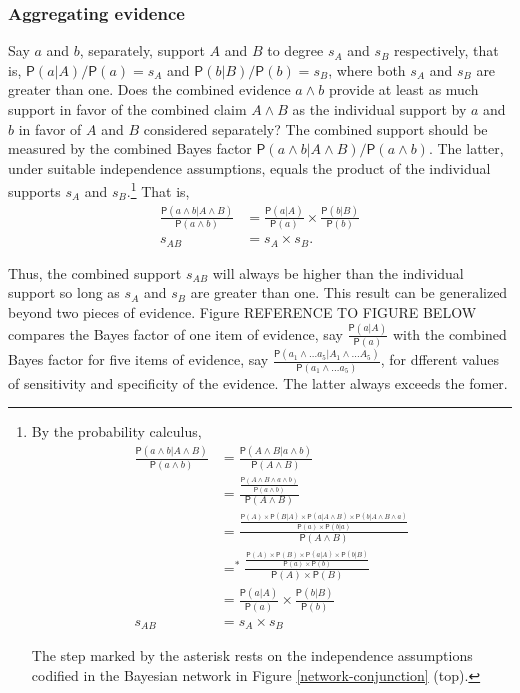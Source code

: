 \documentclass[10pt,dvipsnames,enabledeprecatedfontcommands]{scrartcl}
\newcommand{\et}{\wedge}
\newcommand{\pr}[1]{\mathsf{P}(#1)}
\begin{document}
\hypertarget{aggregating-evidence}{%
\subsubsection{Aggregating evidence}\label{aggregating-evidence}}

Say \(a\) and \(b\), separately, support \(A\) and \(B\) to degree
\(s_A\) and \(s_B\) respectively, that is, \(\pr{a | A}/\pr{a}=s_A\) and
\(\pr{b | B}/\pr{b}=s_B\), where both \(s_A\) and \(s_B\) are greater
than one. Does the combined evidence \(a \wedge b\) provide at least as
much support in favor of the combined claim \(A \wedge B\) as the
individual support by \(a\) and \(b\) in favor of \(A\) and \(B\)
considered separately? The combined support should be measured by the
combined Bayes factor \(\pr{a \wedge b| A\wedge B}/\pr{a \wedge b}\).
The latter, under suitable independence assumptions, equals the product
of the individual supports \(s_{A}\) and
\(s_{B}\).\footnote{By the probability calculus,
 \begin{align*}
\frac{\pr{a \wedge b| A\wedge B}}{\pr{a \wedge b}} & =  \frac{\pr{A \et B| a\wedge b}}{\pr{A \et B}}\\
& =  \frac{\frac{ \pr{A \et B \et a \wedge b }}{\pr{a \et b}}}{\pr{A \et B}} \\ 
& =  \frac{\frac{ \pr{A} \times \pr{B|A} \times \pr{a | A \wedge B} \times \pr{b | A \wedge B \wedge a}}{\pr{a} \times \pr{b | a}}}{\pr{A \et B}} \\ 
& =^*  \frac{\frac{\pr{A} \times \pr{B} \times \pr{a | A} \times \pr{b | B}}{\pr{a} \times \pr{b}}}{\pr{A} \times \pr{B}} \\ 
& =  \frac{\pr{a |A}}{\pr{a}} \times \frac{\pr{b |B}}{\pr{b}} \\
s_{AB}& =  s_{A}\times s_{B} 
 \end{align*}

\noindent
The step marked by the asterisk rests on the 
independence assumptions codified in the Bayesian network 
in Figure \ref{network-conjunction} (top).} That is, \begin{align*}
\frac{\pr{a \wedge b| A\wedge B}}{\pr{a \wedge b}} & =  \frac{\pr{a |A}}{\pr{a}} \times \frac{\pr{b |B}}{\pr{b}} \\
s_{AB}& =  s_{A}\times s_{B}.
 \end{align*}

\noindent  Thus, the combined support \(s_{AB}\) will always be higher
than the individual support so long as \(s_{A}\) and \(s_{B}\) are
greater than one. This result can be generalized beyond two pieces of
evidence. Figure REFERENCE TO FIGURE BELOW compares the Bayes factor of
one item of evidence, say \(\frac{\pr{a \vert A}}{\pr{a}}\) with the
combined Bayes factor for five items of evidence, say
\(\frac{\pr{a_1 \wedge \dots a_5 \vert A_1 \wedge \dots A_5}}{\pr{a_1\wedge \dots a_5}}\),
for dfferent values of sensitivity and specificity of the evidence. The
latter always exceeds the fomer.
\end{document}
